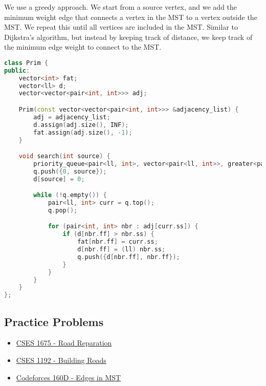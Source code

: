 \documentclass[12pt]{article}
\begin{document}
We use a greedy approach. We start from a source vertex, and we add the minimum weight edge that connects a vertex in the MST to a vertex outside the MST. We repeat this until all vertices are included in the MST. Similar to Dijkstra's algorithm, but instead by keeping track of distance, we keep track of the minimum edge weight to connect to the MST.

\begin{lstlisting}[language=C++]
class Prim {
public:
    vector<int> fat;
    vector<ll> d;
    vector<vector<pair<int, int>>> adj;

    Prim(const vector<vector<pair<int, int>>> &adjacency_list) {
        adj = adjacency_list;
        d.assign(adj.size(), INF);
        fat.assign(adj.size(), -1);
    }

    void search(int source) {
        priority_queue<pair<ll, int>, vector<pair<ll, int>>, greater<pair<ll, int>>> q;
        q.push({0, source});
        d[source] = 0;

        while (!q.empty()) {
            pair<ll, int> curr = q.top();
            q.pop();

            for (pair<int, int> nbr : adj[curr.ss]) {
                if (d[nbr.ff] > nbr.ss) {
                    fat[nbr.ff] = curr.ss;
                    d[nbr.ff] = (ll) nbr.ss;
                    q.push({d[nbr.ff], nbr.ff});
                }
            }
        }
    }
};
\end{lstlisting}
\subsection{Practice Problems}
\begin{itemize}
    \item \href{https://cses.fi/problemset/task/1675}{CSES 1675 - Road Reparation}
    \item \href{https://cses.fi/problemset/task/1192}{CSES 1192 - Building Roads}
    \item \href{https://codeforces.com/problemset/problem/160/D}{Codeforces 160D - Edges in MST}
\end{itemize}
\end{document}
